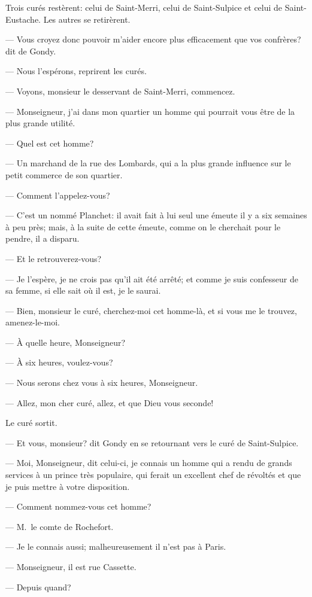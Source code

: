 Trois curés restèrent: celui de Saint-Merri, celui de Saint-Sulpice et celui de Saint-Eustache. Les autres se retirèrent.

— Vous croyez donc pouvoir m'aider encore plus efficacement que vos confrères? dit de Gondy.

— Nous l'espérons, reprirent les curés.

— Voyons, monsieur le desservant de Saint-Merri, commencez.

— Monseigneur, j'ai dans mon quartier un homme qui pourrait vous être de la plus grande utilité.

— Quel est cet homme?

— Un marchand de la rue des Lombards, qui a la plus grande influence sur le petit commerce de son quartier.

— Comment l'appelez-vous?

— C'est un nommé Planchet: il avait fait à lui seul une émeute il y a six semaines à peu près; mais, à la suite de cette émeute, comme on le cherchait pour le pendre, il a disparu.

— Et le retrouverez-vous?

— Je l'espère, je ne crois pas qu'il ait été arrêté; et comme je suis confesseur de sa femme, si elle sait où il est, je le saurai.

— Bien, monsieur le curé, cherchez-moi cet homme-là, et si vous me le trouvez, amenez-le-moi.

— À quelle heure, Monseigneur?

— À six heures, voulez-vous?

— Nous serons chez vous à six heures, Monseigneur.

— Allez, mon cher curé, allez, et que Dieu vous seconde!

Le curé sortit.

— Et vous, monsieur? dit Gondy en se retournant vers le curé de Saint-Sulpice.

— Moi, Monseigneur, dit celui-ci, je connais un homme qui a rendu de grands services à un prince très populaire, qui ferait un excellent chef de révoltés et que je puis mettre à votre disposition.

— Comment nommez-vous cet homme?

— M.~le comte de Rochefort.

— Je le connais aussi; malheureusement il n'est pas à Paris.

— Monseigneur, il est rue Cassette.

— Depuis quand?

